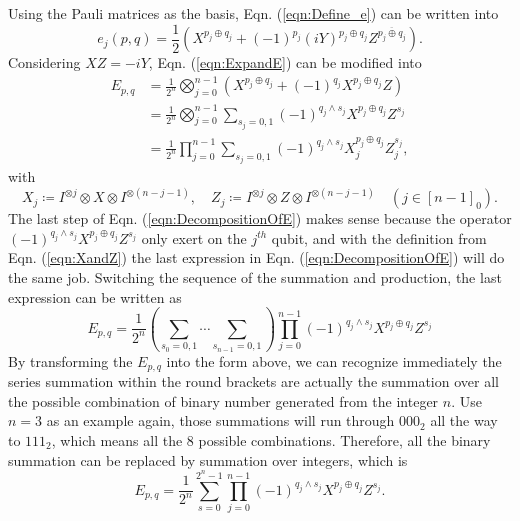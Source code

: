 Using the Pauli matrices as the basis, Eqn. (\ref{eqn:Define_e}) can be written into
\begin{equation}
    e_j(p,q)=\frac{1}{2}(X^{p_j\oplus q_j}+(-1)^{p_j}(iY)^{p_j\oplus q_j}Z^{\overline{p_j \oplus q_j}}).
\end{equation}
Considering $XZ=-iY$, Eqn. (\ref{eqn:ExpandE}) can be modified into
\begin{equation}
    \begin{split}
        E_{p,q}&=\frac{1}{2^n}\bigotimes_{j=0}^{n-1}(X^{p_j\oplus q_j}+(-1)^{q_j}X^{p_j\oplus q_j}Z) \\
        &=\frac{1}{2^n}\bigotimes_{j=0}^{n-1}\sum_{s_j=0,1}(-1)^{q_j\wedge s_j}X^{p_j\oplus q_j}Z^{s_j}\\
        &=\frac{1}{2^n}\prod_{j=0}^{n-1}\sum_{s_j=0,1}(-1)^{q_j\wedge s_j}X_j^{p_j\oplus q_j}Z_j^{s_j},
    \end{split}
    \label{eqn:DecompositionOfE}
\end{equation}
with 
\begin{equation}
    X_j\coloneqq I^{\otimes j}\otimes X\otimes I^{\otimes(n-j-1)}, \quad Z_j\coloneqq I^{\otimes j}\otimes Z\otimes I^{\otimes(n-j-1)}\quad (j\in[n-1]_0).
    \label{eqn:XandZ}
\end{equation}
The last step of Eqn. (\ref{eqn:DecompositionOfE}) makes sense because the operator $(-1)^{q_j\wedge s_j}X^{p_j\oplus q_j}Z^{s_j}$ only exert on the $j^{th}$ qubit, and with the definition from Eqn. (\ref{eqn:XandZ}) the last expression in Eqn. (\ref{eqn:DecompositionOfE}) will do the same job. Switching the sequence of the summation and production, the last expression can be written as
\begin{equation}
    E_{p,q}=\frac{1}{2^n}\left(\sum_{s_0=0,1}\cdots\sum_{s_{n-1}=0,1}\right)\prod_{j=0}^{n-1}(-1)^{q_j\wedge s_j}X^{p_j\oplus q_j}Z^{s_j}
    \label{eqn:Epq3}
\end{equation}
By transforming the $E_{p,q}$ into the form above, we can recognize immediately the series summation within the round brackets are actually the summation over all the possible combination of binary number generated from the integer $n$. Use $n=3$ as an example again, those summations will run through $000_2$ all the way to $111_2$, which means all the 8 possible combinations. Therefore, all the binary summation can be replaced by summation over integers, which is
\begin{equation}
    E_{p,q}=\frac{1}{2^n}\sum_{s=0}^{2^n-1}\prod_{j=0}^{n-1}(-1)^{q_j\wedge s_j}X^{p_j\oplus q_j}Z^{s_j}.
    \label{eqn:Epq4}
\end{equation}
